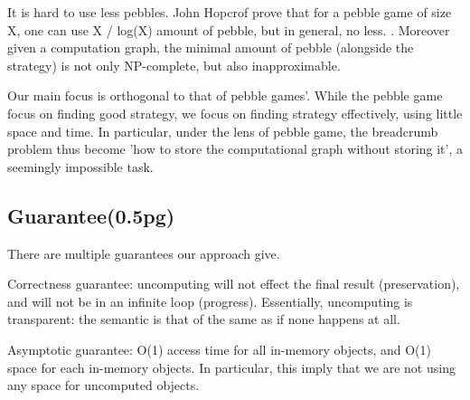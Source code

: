 It is hard to use less pebbles. John Hopcrof prove that for a pebble game of size X, one can use X / log(X) amount of pebble, but in general, no less. . Moreover given a computation graph, the minimal amount of pebble (alongside the strategy) is not only NP-complete, but also inapproximable.


Our main focus is orthogonal to that of pebble games'. While the pebble game focus on finding good strategy, we focus on finding strategy effectively, using little space and time. In particular, under the lens of pebble game, the breadcrumb problem thus become 'how to store the computational graph without storing it', a seemingly impossible task.
\subsection{Guarantee(0.5pg)}
There are multiple guarantees our approach give.

Correctness guarantee: uncomputing will not effect the final result (preservation), and will not be in an infinite loop (progress). Essentially, uncomputing is transparent: the semantic is that of the same as if none happens at all.

Asymptotic guarantee: O(1) access time for all in-memory objects, and O(1) space for each in-memory objects. In particular, this imply that we are not using any space for uncomputed objects.
